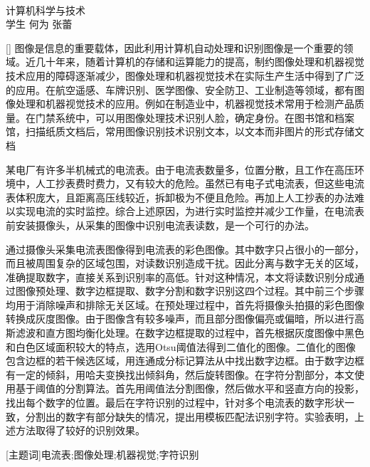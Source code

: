 \begin{center}
\vspace*{18pt}
{\heiti{}\thesistitle}\\[18pt]
\quad 计算机科学与技术\\[12pt]
{\kaishu 学生} \quad 何为  \quad 张蕾\\[24pt]
\end{center}\par

[{}]
图像是信息的重要载体，因此利用计算机自动处理和识别图像是一个重要的领域。近几十年来，随着计算机的存储和运算能力的提高，制约图像处理和机器视觉技术应用的障碍逐渐减少，图像处理和机器视觉技术在实际生产生活中得到了广泛的应用。在航空遥感、车牌识别、医学图像、安全防卫、工业制造等领域，都有图像处理和机器视觉技术的应用。例如在制造业中，机器视觉技术常用于检测产品质量。在门禁系统中，可以用图像处理技术识别人脸，确定身份。在图书馆和档案馆，扫描纸质文档后，常用图像识别技术识别文本，以文本而非图片的形式存储文档

某电厂有许多半机械式的电流表。由于电流表数量多，位置分散，且工作在高压环境中，人工抄表费时费力，又有较大的危险。虽然已有电子式电流表，但这些电流表体积庞大，且距离高压线较近，拆卸极为不便且危险。再加上人工抄表的办法难以实现电流的实时监控。综合上述原因，为进行实时监控并减少工作量，在电流表前安装摄像头，从采集的图像中识别电流表读数，是一个可行的办法。

通过摄像头采集电流表图像得到电流表的彩色图像。其中数字只占很小的一部分，而且被周围复杂的区域包围，对读数识别造成干扰。因此分离与数字无关的区域，准确提取数字，直接关系到识别率的高低。针对这种情况，本文将读数识别分成通过图像预处理、数字边框提取、数字分割和数字识别这四个过程。其中前三个步骤均用于消除噪声和排除无关区域。在预处理过程中，首先将摄像头拍摄的彩色图像转换成灰度图像。由于图像含有较多噪声，而且部分图像偏亮或偏暗，所以进行高斯滤波和直方图均衡化处理。在数字边框提取的过程中，首先根据灰度图像中黑色和白色区域面积较大的特点，选用Otsu阈值法得到二值化的图像。二值化的图像包含边框的若干候选区域，用连通成分标记算法从中找出数字边框。由于数字边框有一定的倾斜，用哈夫变换找出倾斜角，然后旋转图像。在字符分割部分，本文使用基于阈值的分割算法。首先用阈值法分割图像，然后做水平和竖直方向的投影，找出每个数字的位置。最后在字符识别的过程中，针对多个电流表的数字形状一致，分割出的数字有部分缺失的情况，提出用模板匹配法识别字符。实验表明，上述方法取得了较好的识别效果。

\vspace{10pt}

[{\heiti 主题词}]{\kaishu 电流表;\quad 图像处理;\quad 机器视觉;\quad 字符识别}

